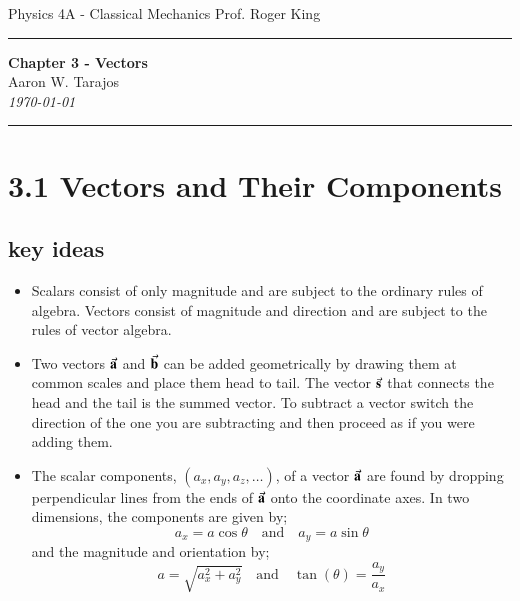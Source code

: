 \documentclass{article}
\begin{document}
\noindent
Physics 4A - Classical Mechanics \hfill Prof. Roger King

\noindent\rule{\textwidth}{0.4pt}

\begin{center}
    \textbf{\LARGE Chapter 3 - Vectors} \\
    \vspace{12pt}
    \large Aaron W. Tarajos \\
    \textit{\today}
\end{center}

\noindent\rule{\textwidth}{0.4pt}

\section*{3.1 Vectors and Their Components}
\subsection*{key ideas}
\begin{itemize}
	\item Scalars consist of only magnitude and are subject to the ordinary rules of algebra.
	Vectors consist of magnitude and direction and are subject to the rules of vector algebra.
	\item Two vectors $\va{a}$ and $\va{b}$ can be added geometrically by drawing them at common scales and place them head to tail.
	The vector $\va{s}$ that connects the head and the tail is the summed vector.
	To subtract a vector switch the direction of the one you are subtracting and then proceed as if you were adding them.
	\item The scalar components, $(a_x, a_y, a_z, \dots)$, of a vector $\va{a}$ are found by dropping perpendicular lines from the ends of
	$\va{a}$ onto the coordinate axes. In two dimensions, the components are given by;
	\[
		a_x = a \cos{\theta} \quad \text{and} \quad a_y = a \sin{\theta}
	\]
	and the magnitude and orientation by;
	\[
		a = \sqrt{a_x^2 + a_y^2} \quad \text{and} \quad \tan(\theta) = \frac{a_y}{a_x}
	\]
\end{itemize}
\end{document}

